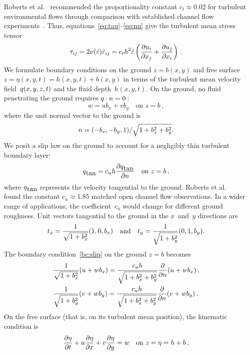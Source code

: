 \documentclass[twocolumn]{afmc_art}
\newcommand{\ros}{{\dot\varepsilon}}
\renewcommand{\vec}[1]{\text{\boldmath$#1$}}
\begin{document}
Roberts et al.~\cite{Roberts2008} recommended the proportionality constant $c_t\approx0.02$ for turbulent environmental flows through comparison with established channel flow experiments~\cite[e.g.]{Nezu2005}.
Thus, equations~\eqref{eq:tau}--\eqref{eq:nu} give the turbulent mean stress tensor
\begin{equation}
\tau_{ij}=2\nu(\ros)\ros_{ij}=c_th^2\ros\left( \D{x_j}{u_i} +\D{x_i}{u_j}\right) \,.\label{eq:stress}
\end{equation}
We formulate boundary conditions on the ground $z=b(x,y)$ and free surface $z=\eta(x,y,t)=h(x,y,t)+b(x,y)$ in terms of the turbulent mean velocity field~$\vec q(x,y,z,t)$ and the fluid depth~$h(x,y,t)$. 
On the ground, no fluid penetrating the ground requires $\vec q\cdot\vec n=0$\,:
\begin{equation}
w=ub_x+vb_y \quad\text{on } z=b\,,
\label{eq:nopen}
\end{equation}
where the unit normal vector to the ground is
\begin{equation}
\vec n=(-b_x,-b_y,1)/\sqrt{1+b_x^2+b_y^2}.
\label{eq:vecn}
\end{equation} 
We posit a slip law on the ground to account for a negligibly thin turbulent boundary layer:
\begin{equation}
\vec q_{\text{tan}}=c_uh\frac{\partial\vec q_{\text{tan}}}{\partial n} \quad\text{on } z=b\,,
\label{bc:slip}
\end{equation} 
where $\vec q_{\text{tan}}$ represents the velocity tangential to the ground. 
Roberts et al.~\cite{Roberts2008} found the constant $c_u\approx1.85$ matched open channel flow observations. 
In a wider range of applications, the coefficient~$c_u$ would change for different ground roughness. 
Unit vectors tangential to the ground in the $x$~and~$y$ directions are
\begin{equation*}
\vec t_x=\frac{1}{\sqrt{1+b_x^2}}(1,0,b_x)
\quad\text{and}\quad
\vec t_y=\frac{1}{\sqrt{1+b_y^2}}(0,1,b_y).
\end{equation*}
The boundary condition~\eqref{bc:slip} on the ground \(z=b\) becomes
\begin{align}&
\frac{1}{\sqrt{1+b_x^2}}(u+wb_x)=\frac{c_uh}{\sqrt{1+b_x^2+b_y^2}}\D n{}(u+wb_x)\,,\label{slip:u}\\&
\frac{1}{\sqrt{1+b_y^2}}(v+wb_y)=\frac{c_uh}{\sqrt{1+b_x^2+b_y^2}}\D n{}(v+wb_y)\,.\label{slip:v}
\end{align}
On the free surface (that is, on its turbulent mean position), the kinematic condition is 
\begin{equation}
 \D{t}{\eta}+u\D{x}{\eta}+v\D{y}{\eta}=w \quad\text{on } z=\eta=h+b\,,
\end{equation}
\end{document}
